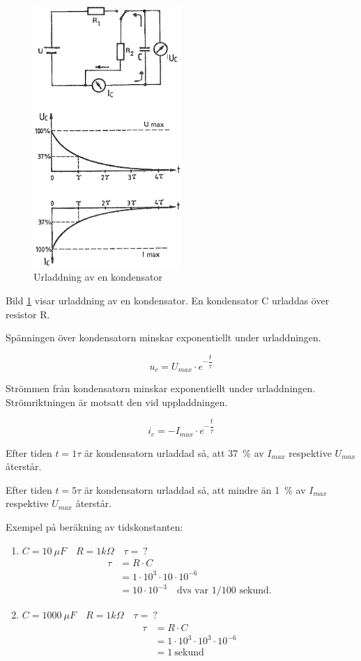 \begin{figure}
\includegraphics[width=0.5\textwidth]{images/cropped_pdfs/bild_2_3-09.pdf}
\caption{Urladdning av en kondensator}
\label{fig:BildII3-09}
\end{figure}

Bild \ref{fig:BildII3-09} visar urladdning av en kondensator.
En kondensator C urladdas över resistor R.

Spänningen över kondensatorn minskar exponentiellt under urladdningen.

\[u_c = U_{max} \cdot e^{-\dfrac{t}{\tau}}\]

Strömmen från kondensatorn minskar exponentiellt under urladdningen.
Strömriktningen är motsatt den vid uppladdningen.

\[i_c = - I_{max} \cdot e^{-\dfrac{t}{\tau}}\]

Efter tiden \(t = 1\tau\) är kondensatorn urladdad så, att 37~\% av \(I_{max}\)
respektive \(U_{max}\) återstår.

Efter tiden \(t = 5\tau\) är kondensatorn urladdad så, att mindre än 1~\% av
\(I_{max}\) respektive \(U_{max}\) återstår.

Exempel på beräkning av tidskonstanten:
\begin{enumerate}
\item \(C = 10\ \mu F \quad R = 1 k\Omega \quad \tau =\ ?\)
  \begin{align*}
    \tau &= R \cdot C \\
    &= 1 \cdot 10^3 \cdot 10 \cdot 10^{-6} \\
    &= 10 \cdot 10^{-3} \quad \text{dvs var 1/100 sekund.}
  \end{align*}
\item \(C = 1000\ \mu F \quad R = 1 k\Omega \quad \tau =\ ?\)
  \begin{align*}
    \tau &= R \cdot C \\
    &= 1 \cdot 10^3 \cdot 10^3 \cdot 10^{-6} \\
    &= 1\ \text{sekund}
  \end{align*}
\end{enumerate}

